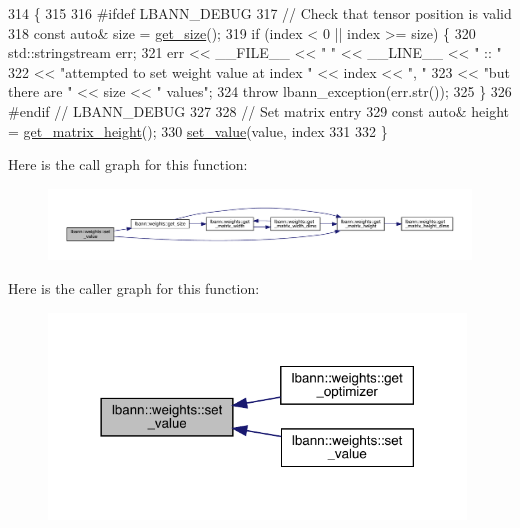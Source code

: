 \begin{DoxyCode}
314                                                  \{
315 
316 \textcolor{preprocessor}{#ifdef LBANN\_DEBUG}
317   \textcolor{comment}{// Check that tensor position is valid}
318   \textcolor{keyword}{const} \textcolor{keyword}{auto}& size = \hyperlink{classlbann_1_1weights_a3216926df0aaf7aa440b9e5317d05fa2}{get\_size}();
319   \textcolor{keywordflow}{if} (index < 0 || index >= size) \{
320     std::stringstream err;
321     err << \_\_FILE\_\_ << \textcolor{stringliteral}{" "} << \_\_LINE\_\_ << \textcolor{stringliteral}{" :: "}
322         << \textcolor{stringliteral}{"attempted to set weight value at index "} << index << \textcolor{stringliteral}{", "}
323         << \textcolor{stringliteral}{"but there are "} << size << \textcolor{stringliteral}{" values"};
324     \textcolor{keywordflow}{throw} lbann\_exception(err.str());
325   \}
326 \textcolor{preprocessor}{#endif // LBANN\_DEBUG}
327 
328   \textcolor{comment}{// Set matrix entry}
329   \textcolor{keyword}{const} \textcolor{keyword}{auto}& height = \hyperlink{classlbann_1_1weights_ad36676b9b43bced1cc7e332e3745411f}{get\_matrix\_height}();
330   \hyperlink{classlbann_1_1weights_aaae37ad2df0808eb606609cd58cd223b}{set\_value}(value, index %
331 
332 \}
\end{DoxyCode}
Here is the call graph for this function\+:\nopagebreak
\begin{figure}[H]
\begin{center}
\leavevmode
\includegraphics[width=350pt]{classlbann_1_1weights_aaae37ad2df0808eb606609cd58cd223b_cgraph}
\end{center}
\end{figure}
Here is the caller graph for this function\+:\nopagebreak
\begin{figure}[H]
\begin{center}
\leavevmode
\includegraphics[width=314pt]{classlbann_1_1weights_aaae37ad2df0808eb606609cd58cd223b_icgraph}
\end{center}
\end{figure}
\mbox{\label{classlbann_1_1weights_aca05fb7e298c8f9f1f30fa1a8eac9fbf}} 
